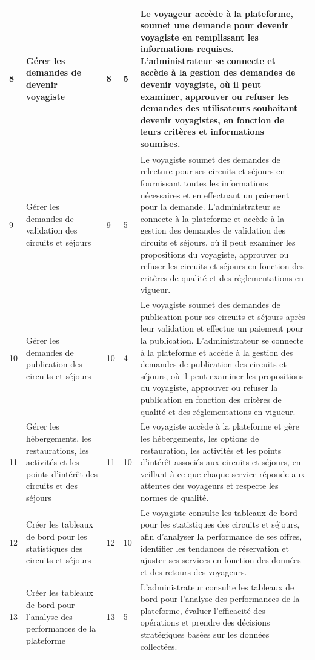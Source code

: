 \documentclass[12pt]{report}
\begin{document}
\begin{longtable}{|p{1cm}|p{3cm}|p{2cm}|p{2cm}|p{6cm}|}
						\\
						\hline
						 8&Gérer les demandes de devenir voyagiste&8&5&
						Le voyageur accède à la plateforme, soumet une demande pour devenir voyagiste en remplissant les informations requises. L'administrateur se connecte et accède à la gestion des demandes de devenir voyagiste, où il peut examiner, approuver ou refuser les demandes des utilisateurs souhaitant devenir voyagistes, en fonction de leurs critères et informations soumises.
						\\
						\hline
						 9& Gérer les demandes de validation des circuits et séjours&9&5&
						Le voyagiste soumet des demandes de relecture pour ses circuits et séjours en fournissant toutes les informations nécessaires et en effectuant un paiement pour la demande. L'administrateur se connecte à la plateforme et accède à la gestion des demandes de validation des circuits et séjours, où il peut examiner les propositions du voyagiste, approuver ou refuser les circuits et séjours en fonction des critères de qualité et des réglementations en vigueur.
						\\
						\hline
						 10&Gérer les demandes de publication des circuits et séjours&10&4&
						Le voyagiste soumet des demandes de publication pour ses circuits et séjours après leur validation et effectue un paiement pour la publication. L'administrateur se connecte à la plateforme et accède à la gestion des demandes de publication des circuits et séjours, où il peut examiner les propositions du voyagiste, approuver ou refuser la publication en fonction des critères de qualité et des réglementations en vigueur.						\\
						\hline
						 11&Gérer les hébergements, les restaurations, les activités et les points d'intérêt des circuits et des séjours &11&10&
						Le voyagiste accède à la plateforme et gère les hébergements, les options de restauration, les activités et les points d'intérêt associés aux circuits et séjours, en veillant à ce que chaque service réponde aux attentes des voyageurs et respecte les normes de qualité.
						\\
						\hline
						 12&Créer les tableaux de bord pour les statistiques des circuits et séjours&12&10&
						Le voyagiste consulte les tableaux de bord pour les statistiques des circuits et séjours, afin d'analyser la performance de ses offres, identifier les tendances de réservation et ajuster ses services en fonction des données et des retours des voyageurs.
						\\
						\hline
						 13&Créer les tableaux de bord pour l'analyse des performances de la plateforme&13&5&
						L'administrateur consulte les tableaux de bord pour l'analyse des performances de la plateforme, évaluer l'efficacité des opérations et prendre des décisions stratégiques basées sur les données collectées.


\end{longtable}
\end{document}
